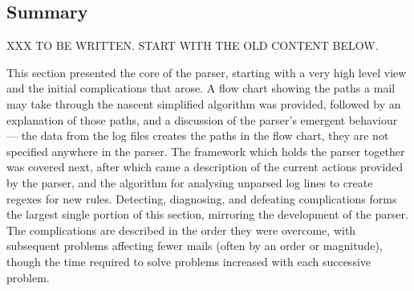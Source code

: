 \subsection{Summary}

XXX TO BE WRITTEN\@.  START WITH THE OLD CONTENT BELOW\@.

This section presented the core of the parser, starting with a very high
level view and the initial complications that arose.  A flow chart showing
the paths a mail may take through the nascent simplified algorithm was
provided, followed by an explanation of those paths, and a discussion of
the parser's emergent behaviour --- the data from the log files creates the
paths in the flow chart, they are not specified anywhere in the parser.
The framework which holds the parser together was covered next, after which
came a description of the current actions provided by the parser, and the
algorithm for analysing unparsed log lines to create regexes for new
rules.  Detecting, diagnosing, and defeating complications forms the largest
single portion of this section, mirroring the development of the parser.
The complications are described in the order they were overcome, with
subsequent problems affecting fewer mails (often by an order or magnitude),
though the time required to solve problems increased with each successive
problem.



